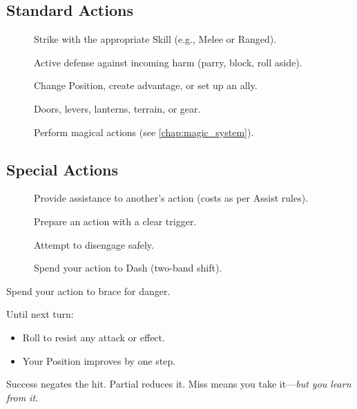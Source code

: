 \subsection{Standard Actions}\label{subsec:standard_actions}
\begin{description}
    \item[] Strike with the appropriate Skill (e.g., Melee or Ranged).
    \item[] Active defense against incoming harm (parry, block, roll aside).
    \item[] Change Position, create advantage, or set up an ally.
    \item[] Doors, levers, lanterns, terrain, or gear.
    \item[] Perform magical actions (see \autoref{chap:magic_system}).
\end{description}

\subsection{Special Actions}\label{subsec:special_actions}
\begin{description}
    \item[] Provide assistance to another's action (costs as per Assist rules).
    \item[] Prepare an action with a clear trigger.
    \item[] Attempt to disengage safely.
    \item[] Spend your action to Dash (two‑band shift).
\end{description}

\begin{tcolorbox}[title={Quick Rule: Defend},colback=blue!5!white,colframe=blue!75!black,breakable]
Spend your action to brace for danger.

Until next turn:
\begin{itemize}
    \item Roll to resist any attack or effect.
    \item Your Position improves by one step.
\end{itemize}
Success negates the hit. Partial reduces it. Miss means you take it---\emph{but you learn from it}.
\end{tcolorbox}

